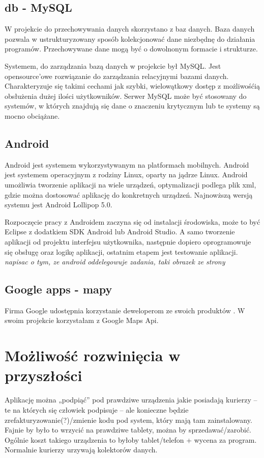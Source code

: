 \documentclass[eng,printmode,oneside]{mgr}
\begin{document}
\section{db - MySQL}

W projekcie do przechowywania danych skorzystano z baz danych. Baza danych
pozwala w ustrukturyzowany sposób kolekcjonować dane niezbędnę do działania
programów. Przechowywane dane mogą być o dowolnonym formacie i strukturze.

Systemem, do zarządzania bazą danych w projekcie był MySQL. Jest opensource'owe
rozwiązanie do zarządzania relacyjnymi bazami danych. Charakteryzuje się takimi
cechami jak szybki, wielowątkowy dostęp z możliwośćią obsłużenia dużej ilości
użytkowników. Serwer MySQL może być stosowany do systemów, w których znajdują
się dane o znaczeniu krytycznym lub te systemy są mocno obciążane. \cite{Mysql.com} 

\section{Android}

Android jest systemem wykorzystywanym na platformach mobilnych. Android
jest systemem operacyjnym z rodziny Linux, oparty na jądrze Linux. Android
umożliwia tworzenie aplikacji na wiele urządzeń, optymalizacji podlega plik xml,
gdzie można dostosować aplikację do konkretnych urządzeń. Najnowższą wersją
systemu jest Android Lollipop 5.0. 

Rozpoczęcie pracy z Androidem zaczyna się od instalacji środowiska, może to być
Eclipse z dodatkiem SDK Android lub Android Studio. A samo tworzenie aplikacji
od projektu interfejsu użytkownika, następnie dopiero oprogramowuje się obsługę
oraz logikę aplikacji, ostatnim etapem jest testowanie aplikacji.
\cite{developer.android}
\emph{\color{komentarz}napisac o tym, ze android oddelegowuje zadania, taki
obrazek ze strony}

\section{Google apps - mapy}

Firma Google udostępnia korzystanie deweloperom ze swoich produktów
\cite{developer.google}. W swoim projekcie korzystałam z Google Maps Api. 

\chapter{Możliwość rozwinięcia w przyszłości}
Aplikację można „podpiąć” pod prawdziwe urządzenia jakie posiadają kurierzy – te na których się człowiek podpisuje – ale konieczne będzie 
zrefakturyzowanie(?)/zmienie kodu pod system, który mają tam zainstalowany.
	Fajnie by było to wrzycić na prawdziwe tablety, można by sprzedawać/zarobić. Ogólnie koszt takiego urządzenia to byłoby tablet/telefon 
	+ wycena za program.
	Normalnie kurierzy urzywają kolektorów danych.
\end{document}
